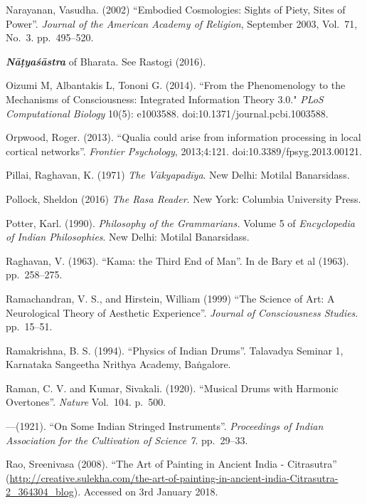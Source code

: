 \begin{thebibliography}{99}
Narayanan, Vasudha. (2002) “Embodied Cosmologies: Sights of Piety, Sites of Power”. \textsl{Journal of the American Academy of Religion}, September 2003, Vol.~71, No.~3. pp.~495--520.

{\sl\bfseries Nāṭyaśāstra} of Bharata. See Rastogi (2016).

Oizumi M, Albantakis L, Tononi G. (2014). ``From the Phenomenology to the Mechanisms of Consciousness: Integrated Information Theory 3.0." \textsl{PLoS Computational Biology} 10(5): e1003588. doi:10.1371/journal.pcbi.1003588. 

Orpwood, Roger. (2013). “Qualia could arise from information processing in local cortical networks”. \textsl{Frontier Psychology}, 2013;4:121. doi:10.3389/fpsyg.2013.00121.

Pillai, Raghavan, K. (1971) \textsl{The Vākyapadīya}. New Delhi: Motilal Banarsidass.

Pollock, Sheldon (2016) \textsl{The Rasa Reader}. New York: Columbia University Press.

Potter, Karl. (1990). \textsl{Philosophy of the Grammarians.} Volume 5 of \textsl{Encyclopedia of Indian Philosophies}. New Delhi: Motilal Banarsidass.

Raghavan, V. (1963). “Kama: the Third End of Man”. In de Bary et al (1963). pp.~258--275.

Ramachandran, V. S., and Hirstein, William (1999) “The Science of Art: A Neurological Theory of Aesthetic Experience”. \textsl{Journal of Consciousness Studies}. pp.~15--51.

Ramakrishna, B. S. (1994). “Physics of Indian Drums”. Talavadya Seminar 1, Karnataka Sangeetha Nrithya Academy, Baṅgalore.

Raman, C. V. and Kumar, Sivakali. (1920). “Musical Drums with Harmonic Overtones”. \textsl{Nature} Vol.~104. p.~500.

---\kern3pt(1921). “On Some Indian Stringed Instruments”. \textsl{Proceedings of Indian Association for the Cultivation of Science 7}. pp.~29--33.

Rao, Sreenivasa (2008). “The Art of Painting in Ancient India - Citrasutra” (\url{http://creative.sulekha.com/the-art-of-painting-in-ancient-india-Citrasutra-2_364304_blog}). Accessed on 3rd January 2018.


\end{thebibliography}

